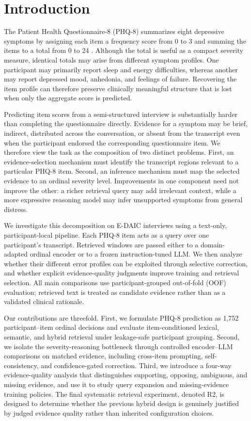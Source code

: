 \documentclass{article}
\begin{document}
\section{Introduction}
\label{sec:introduction}
The Patient Health Questionnaire-8 (PHQ-8) summarizes eight depressive symptoms by assigning each item a frequency score from 0 to 3 and summing the items to a total from 0 to 24 \cite{kroenke2009phq8}. Although the total is useful as a compact severity measure, identical totals may arise from different symptom profiles. One participant may primarily report sleep and energy difficulties, whereas another may report depressed mood, anhedonia, and feelings of failure. Recovering the item profile can therefore preserve clinically meaningful structure that is lost when only the aggregate score is predicted.

Predicting item scores from a semi-structured interview is substantially harder than completing the questionnaire directly. Evidence for a symptom may be brief, indirect, distributed across the conversation, or absent from the transcript even when the participant endorsed the corresponding questionnaire item. We therefore view the task as the composition of two distinct problems. First, an evidence-selection mechanism must identify the transcript regions relevant to a particular PHQ-8 item. Second, an inference mechanism must map the selected evidence to an ordinal severity level. Improvements in one component need not improve the other: a richer retrieval query may add irrelevant context, while a more expressive reasoning model may infer unsupported symptoms from general distress.

We investigate this decomposition on E-DAIC interviews using a text-only, participant-local pipeline. Each PHQ-8 item acts as a query over one participant's transcript. Retrieved windows are passed either to a domain-adapted ordinal encoder or to a frozen instruction-tuned LLM. We then analyze whether their different error profiles can be exploited through selective correction, and whether explicit evidence-quality judgments improve training and retrieval selection. All main comparisons use participant-grouped out-of-fold (OOF) evaluation; retrieved text is treated as candidate evidence rather than as a validated clinical rationale.

Our contributions are threefold. First, we formulate PHQ-8 prediction as 1,752 participant--item ordinal decisions and evaluate item-conditioned lexical, semantic, and hybrid retrieval under leakage-safe participant grouping. Second, we isolate the severity-reasoning bottleneck through controlled encoder--LLM comparisons on matched evidence, including cross-item prompting, self-consistency, and confidence-gated correction. Third, we introduce a four-way evidence-quality analysis that distinguishes supporting, opposing, ambiguous, and missing evidence, and use it to study query expansion and missing-evidence training policies. The final systematic retrieval experiment, denoted R2, is designed to determine whether the previous hybrid design is genuinely justified by judged evidence quality rather than inherited configuration choices.
\end{document}
